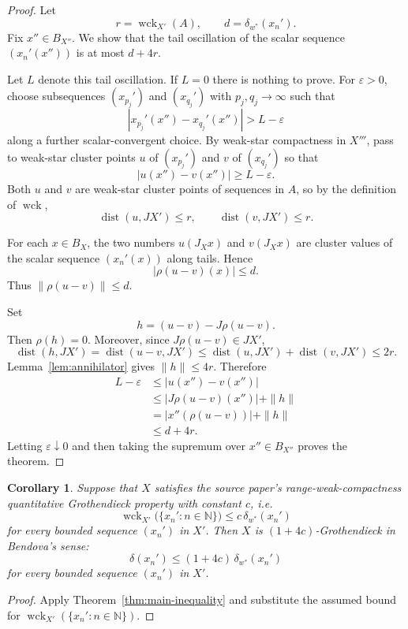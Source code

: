 \documentclass[11pt]{amsart}
\newtheorem{corollary}{Corollary}
\newcommand{\N}{\mathbb N}
\newcommand{\B}{B}
\newcommand{\dist}{\operatorname{dist}}
\newcommand{\wck}{\operatorname{wck}}
\begin{document}
\begin{proof}
Let
\[
  r=\wck_{X'}(A), \qquad d=\delta_{w^*}(x_n').
\]
Fix $x''\in \B_{X''}$. We show that the tail oscillation of the scalar
sequence $(x_n'(x''))$ is at most $d+4r$.

Let $L$ denote this tail oscillation. If $L=0$ there is nothing to prove. For
$\varepsilon>0$, choose subsequences $(x_{p_j}')$ and $(x_{q_j}')$ with
$p_j,q_j\to\infty$ such that
\[
  |x_{p_j}'(x'')-x_{q_j}'(x'')|>L-\varepsilon
\]
along a further scalar-convergent choice. By weak-star compactness in $X'''$,
pass to weak-star cluster points $u$ of $(x_{p_j}')$ and $v$ of $(x_{q_j}')$
so that
\[
  |u(x'')-v(x'')| \ge L-\varepsilon.
\]
Both $u$ and $v$ are weak-star cluster points of sequences in $A$, so by the
definition of $\wck$,
\[
  \dist(u,JX')\le r,\qquad \dist(v,JX')\le r.
\]

For each $x\in \B_X$, the two numbers $u(J_Xx)$ and $v(J_Xx)$ are cluster
values of the scalar sequence $(x_n'(x))$ along tails. Hence
\[
  |\rho(u-v)(x)| \le d.
\]
Thus $\|\rho(u-v)\|\le d$.

Set
\[
  h=(u-v)-J\rho(u-v).
\]
Then $\rho(h)=0$. Moreover, since $J\rho(u-v)\in JX'$,
\[
  \dist(h,JX')=\dist(u-v,JX')
  \le \dist(u,JX')+\dist(v,JX')\le 2r.
\]
Lemma~\ref{lem:annihilator} gives $\|h\|\le 4r$. Therefore
\[
\begin{aligned}
  L-\varepsilon
  &\le |u(x'')-v(x'')| \\
  &\le |J\rho(u-v)(x'')|+\|h\| \\
  &= |x''(\rho(u-v))|+\|h\| \\
  &\le d+4r.
\end{aligned}
\]
Letting $\varepsilon\downarrow 0$ and then taking the supremum over
$x''\in\B_{X''}$ proves the theorem.
\end{proof}

\begin{corollary}
\label{cor:source-question}
Suppose that $X$ satisfies the source paper's range-weak-compactness
quantitative Grothendieck property with constant $c$, i.e.
\[
  \wck_{X'}\bigl(\{x_n':n\in\N\}\bigr)
  \le c\,\delta_{w^*}(x_n')
\]
for every bounded sequence $(x_n')$ in $X'$. Then $X$ is
$(1+4c)$-Grothendieck in Bendova's sense:
\[
  \delta(x_n')\le (1+4c)\,\delta_{w^*}(x_n')
\]
for every bounded sequence $(x_n')$ in $X'$.
\end{corollary}

\begin{proof}
Apply Theorem~\ref{thm:main-inequality} and substitute the assumed bound for
$\wck_{X'}(\{x_n':n\in\N\})$.
\end{proof}
\end{document}
